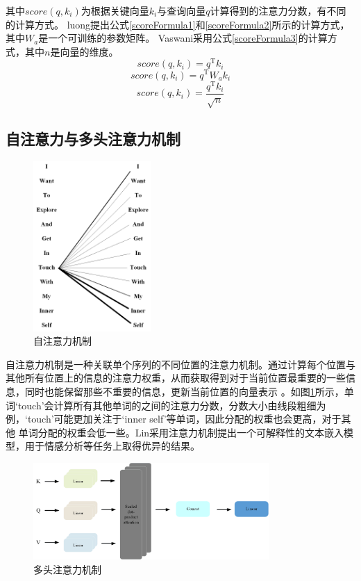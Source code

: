 其中$score(q,k_i)$为根据关键向量$k_i$与查询向量$q$计算得到的注意力分数，有不同的计算方式。
luong提出公式\ref{scoreFormula1}和\ref{scoreFormula2}所示的计算方式，其中$W_a$是一个可训练的参数矩阵。
Vaswani采用公式\ref{scoreFormula3}的计算方式，其中$n$是向量的维度。
\begin{equation}\label{scoreFormula1}
	score(q,k_i)=q^\mathrm{T}k_i
\end{equation}
\begin{equation}\label{scoreFormula2}
	score(q,k_i)=q^\mathrm{T}W_ak_i
\end{equation}
\begin{equation}\label{scoreFormula3}
	score(q,k_i)=\frac{q^\mathrm{T}k_i}{\sqrt{n}}
\end{equation}
\subsection{自注意力与多头注意力机制}

\begin{figure}[htb]%
	\setlength{\belowcaptionskip}{0pt}
	\centering
	\includegraphics[width=0.4\textwidth]{pic/2-11.png}
	\caption{自注意力机制}
	\label{self-att}
\end{figure}
自注意力机制是一种关联单个序列的不同位置的注意力机制。通过计算每个位置与其他所有位置上的信息的注意力权重，从而获取得到对于当前位置最重要的一些信息，同时也能保留那些不重要的信息，更新当前位置的向量表示
。如图\ref{self-att}所示，单词‘touch’会计算所有其他单词的之间的注意力分数，分数大小由线段粗细为例，‘touch’可能更加关注于‘inner self’等单词，因此分配的权重也会更高，对于其他
单词分配的权重会低一些。Lin采用注意力机制提出一个可解释性的文本嵌入模型，用于情感分析等任务上取得优异的结果。
\begin{figure}[htb]%
	\setlength{\belowcaptionskip}{0pt}
	\centering
	\includegraphics[width=0.8\textwidth]{pic/2-12.png}
	\caption{多头注意力机制}
	\label{muti-att}
\end{figure}

